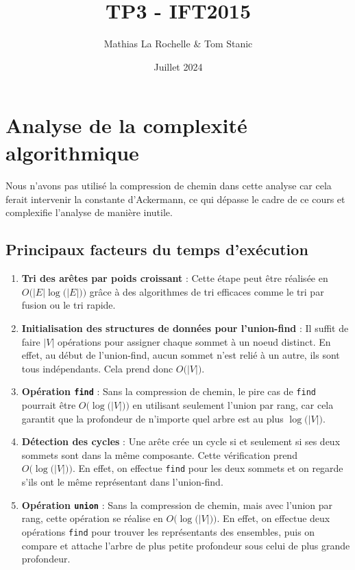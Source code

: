 \documentclass{article}
\title{TP3 - IFT2015}
\author{Mathias La Rochelle \& Tom Stanic}
\date{Juillet 2024}
\begin{document}
\maketitle

\section{Analyse de la complexité algorithmique}
    \paragraph{}
        Nous n'avons pas utilisé la compression de chemin dans cette analyse car cela ferait intervenir la constante d'Ackermann, ce qui dépasse le cadre de ce cours et complexifie l'analyse de manière inutile.

   \subsection{Principaux facteurs du temps d'exécution}

\begin{enumerate}
    \item \textbf{Tri des arêtes par poids croissant} : Cette étape peut être réalisée en $O\Big(|E| \log \big( |E| \big) \Big)$ grâce à des algorithmes de tri efficaces comme le tri par fusion ou le tri rapide.

    \item \textbf{Initialisation des structures de données pour l'union-find} : Il suffit de faire \(|V|\) opérations pour assigner chaque sommet à un noeud distinct. En effet, au début de l'union-find, aucun sommet n'est relié à un autre, ils sont tous indépendants. Cela prend donc \(O\big(|V|\big)\).

    \item \textbf{Opération \texttt{find}} : Sans la compression de chemin, le pire cas de \texttt{find} pourrait être \(O\Big(\log \big(|V|\big)\Big)\) en utilisant seulement l'union par rang, car cela garantit que la profondeur de n'importe quel arbre est au plus \(\log \big(|V|\big)\).

    \item \textbf{Détection des cycles} : Une arête crée un cycle si et seulement si ses deux sommets sont dans la même composante. Cette vérification prend \(O\Big(\log \big(|V|\big)\Big)\). En effet, on effectue \texttt{find} pour les deux sommets et on regarde s'ils ont le même représentant dans l'union-find.

    \item \textbf{Opération \texttt{union}} : Sans la compression de chemin, mais avec l'union par rang, cette opération se réalise en \(O\Big(\log \big(|V|\big)\Big)\). En effet, on effectue deux opérations \texttt{find} pour trouver les représentants des ensembles, puis on compare et attache l'arbre de plus petite profondeur sous celui de plus grande profondeur.
\end{enumerate}
\end{document}
